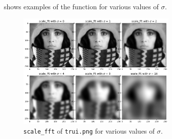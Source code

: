  shows examples of the function for various values of $\sigma$.
\begin{figure}[H]
    \centering
    \includegraphics[width=0.7\textwidth]{figures/task_2_1.png}
    \caption{\texttt{scale\_fft} of \texttt{trui.png} for various values of
    $\sigma$.}
    \label{fig:2.1}
\end{figure}



